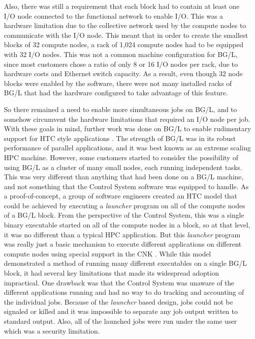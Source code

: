 Also, there was still a requirement that each block had to contain at least one I/O node connected
to the functional network to enable I/O. This was a hardware limitation due to the collective network
used by the compute nodes to communicate with the I/O node. This meant that in order to create the smallest blocks of
32 compute nodes, a rack of 1,024 compute nodes had to be equipped with 32 I/O nodes. This was not a
common machine configuration for BG/L, since most customers chose a ratio of only 8 or 16 I/O nodes
per rack, due to hardware costs and Ethernet switch capacity. As a result, even though 32 node
blocks were enabled by the software, there were not many installed racks of BG/L that had the
hardware configured to take advantage of this feature.

So there remained a need to enable more simultaneous jobs on BG/L, and to somehow circumvent the
hardware limitations that required an I/O node per job. With these goals in mind, further work was
done on BG/L to enable rudimentary support for HTC style applications  \cite{marshall:09}. The
strength of BG/L was in its robust performance of parallel applications, and it was best known as an
extreme scaling HPC machine. However, some customers started to consider the possibility of using
BG/L as a cluster of many small nodes, each running independent tasks. This was very different than
anything that had been done on a BG/L machine, and not something that the Control System software
was equipped to handle. As a proof-of-concept, a group of software engineers created an HTC model
that could be achieved by executing a \emph{launcher} program on all of the compute nodes of a BG/L
block. From the perspective of the Control System, this was a single binary executable started on
all of the compute nodes in a block, so at that level, it was no different than a typical HPC
application. But this \emph{launcher} program was really just a basic mechanism to execute different
applications on different compute nodes using special support in the CNK \cite{peters:08}. While
this model demonstrated a method of running many different executables on a single BG/L block, it
had several key limitations that made its widespread adoption impractical. One drawback was that the
Control System was unaware of the different applications running and had no way to do tracking and
accounting of the individual jobs. Because of the \emph{launcher} based design, jobs could not be
signaled or killed and it was impossible to separate any job output written to standard output.
Also, all of the launched jobs were run under the same user which was a security limitation.

